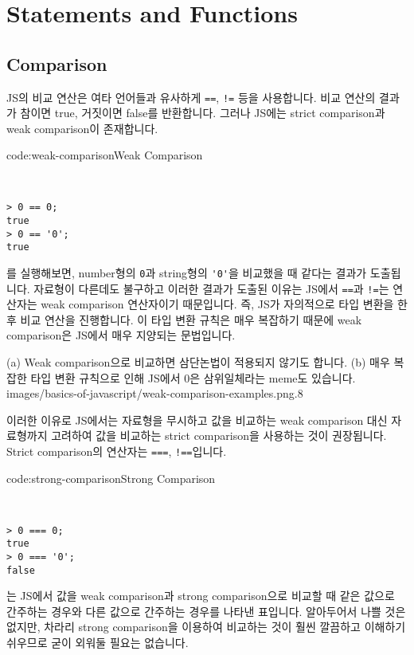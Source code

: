 \section{Statements and Functions} \label{sect:statements-and-functions}

\subsection*{Comparison}

JS의 비교 연산은 여타 언어들과 유사하게 \verb|==|, \verb|!=| 등을 사용합니다. 비교 연산의 결과가 참이면 true, 거짓이면 false를 반환합니다. 그러나 JS에는 strict comparison과 weak comparison이 존재합니다. 

\begin{codeenv}{code:weak-comparison}{Weak Comparison}\begin{verbatim}


> 0 == 0;
true
> 0 == '0';
true
\end{verbatim}
\end{codeenv}

를 실행해보면, number형의 \verb|0|과 string형의 \verb|'0'|을 비교했을 때 같다는 결과가 도출됩니다. 자료형이 다른데도 불구하고 이러한 결과가 도출된 이유는 JS에서 \verb|==|과 \verb|!=|는 연산자는 weak comparison 연산자이기 때문입니다. 즉, JS가 자의적으로 타입 변환을 한 후 비교 연산을 진행합니다. 이 타입 변환 규칙은 매우 복잡하기 때문에 weak comparison은 JS에서 매우 지양되는 문법입니다. 

    {(a) Weak comparison으로 비교하면 삼단논법이 적용되지 않기도 합니다. (b) 매우 복잡한 타입 변환 규칙으로 인해 JS에서 0은 삼위일체라는 meme도 있습니다.}
    {images/basics-of-javascript/weak-comparison-examples.png}{.8}

이러한 이유로 JS에서는 자료형을 무시하고 값을 비교하는 weak comparison 대신 자료형까지 고려하여 값을 비교하는 strict comparison을 사용하는 것이 권장됩니다. Strict comparison의 연산자는 \verb|===|, \verb|!==|입니다.

\begin{codeenv}{code:strong-comparison}{Strong Comparison}\begin{verbatim}


> 0 === 0;
true
> 0 === '0';
false
\end{verbatim}
\end{codeenv}

는 JS에서 값을 weak comparison과 strong comparison으로 비교할 때 같은 값으로 간주하는 경우와 다른 값으로 간주하는 경우를 나타낸 표입니다. 알아두어서 나쁠 것은 없지만, 차라리 strong comparison을 이용하여 비교하는 것이 훨씬 깔끔하고 이해하기 쉬우므로 굳이 외워둘 필요는 없습니다. 

